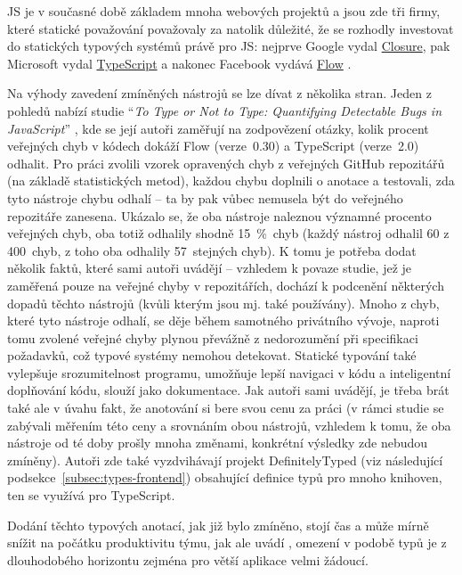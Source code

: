 JS je v současné době základem mnoha webových projektů a jsou zde tři firmy, které statické považování považovaly za natolik důležité, že se rozhodly investovat do statických typových systémů právě pro JS: nejprve Google vydal \href{https://developers.google.com/closure/compiler/}{Closure}, pak Microsoft vydal \href{https://www.typescriptlang.org/}{TypeScript} a nakonec Facebook vydává \href{https://flow.org/}{Flow} \cite{types-study}.

Na výhody zavedení zmíněných nástrojů se lze dívat z několika stran. Jeden z pohledů nabízí studie \enquote{\textit{To Type or Not to Type: Quantifying Detectable Bugs in JavaScript}} \cite{types-study}, kde se její autoři zaměřují na zodpovězení otázky, kolik procent veřejných chyb v kódech dokáží Flow (verze~0.30) a TypeScript (verze~2.0) odhalit. Pro práci zvolili vzorek opravených chyb z veřejných GitHub repozitářů (na základě statistických metod), každou chybu doplnili o anotace a testovali, zda tyto nástroje chybu odhalí -- ta by pak vůbec nemusela být do veřejného repozitáře zanesena. Ukázalo se, že oba nástroje naleznou významné procento veřejných chyb, oba totiž odhalily shodně 15~\%~chyb (každý nástroj odhalil 60 z 400~chyb, z toho oba odhalily 57~stejných chyb). K tomu je potřeba dodat několik faktů, které sami autoři uvádějí -- vzhledem k povaze studie, jež je zaměřená pouze na veřejné chyby v repozitářích, dochází k podcenění některých dopadů těchto nástrojů (kvůli kterým jsou mj. také používány). Mnoho z chyb, které tyto nástroje odhalí, se děje během samotného privátního vývoje, naproti tomu zvolené veřejné chyby plynou převážně z nedorozumění při specifikaci požadavků, což typové systémy nemohou detekovat. Statické typování také vylepšuje srozumitelnost programu, umožňuje lepší navigaci v kódu a inteligentní doplňování kódu, slouží jako dokumentace. Jak autoři sami uvádějí, je třeba brát také ale v úvahu fakt, že anotování si bere svou cenu za práci (v rámci studie se zabývali měřením této ceny a srovnáním obou nástrojů, vzhledem k tomu, že oba nástroje od té doby prošly mnoha změnami, konkrétní výsledky zde nebudou zmíněny). Autoři zde také vyzdvihávají projekt DefinitelyTyped (viz následující podsekce~\ref{subsec:types-frontend}) obsahující definice typů pro mnoho knihoven, ten se využívá pro TypeScript.

Dodání těchto typových anotací, jak již bylo zmíněno, stojí čas a může mírně snížit na počátku produktivitu týmu, jak ale uvádí \cite{types-developerhowto}, omezení v podobě typů je z dlouhodobého horizontu zejména pro větší aplikace velmi žádoucí.

